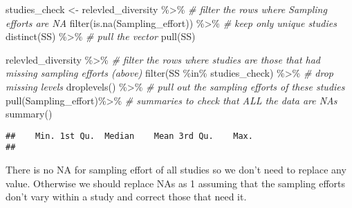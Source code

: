 \documentclass[
]{article}
\newenvironment{Shaded}{\begin{snugshade}}{\end{snugshade}}
\newcommand{\CommentTok}[1]{\textcolor[rgb]{0.56,0.35,0.01}{\textit{#1}}}
\newcommand{\FunctionTok}[1]{\textcolor[rgb]{0.00,0.00,0.00}{#1}}
\newcommand{\NormalTok}[1]{#1}
\newcommand{\OtherTok}[1]{\textcolor[rgb]{0.56,0.35,0.01}{#1}}
\newcommand{\SpecialCharTok}[1]{\textcolor[rgb]{0.00,0.00,0.00}{#1}}
\begin{document}
\begin{Shaded}
\begin{Highlighting}[]
\NormalTok{studies\_check }\OtherTok{\textless{}{-}}\NormalTok{ relevled\_diversity }\SpecialCharTok{\%\textgreater{}\%}
  \CommentTok{\# filter the rows where Sampling efforts are NA}
  \FunctionTok{filter}\NormalTok{(}\FunctionTok{is.na}\NormalTok{(Sampling\_effort)) }\SpecialCharTok{\%\textgreater{}\%}
  \CommentTok{\# keep only unique studies}
  \FunctionTok{distinct}\NormalTok{(SS) }\SpecialCharTok{\%\textgreater{}\%}
  \CommentTok{\# pull the vector}
  \FunctionTok{pull}\NormalTok{(SS)}

\NormalTok{relevled\_diversity }\SpecialCharTok{\%\textgreater{}\%}
  \CommentTok{\# filter the rows where studies are those that had missing sampling efforts (above)}
  \FunctionTok{filter}\NormalTok{(SS }\SpecialCharTok{\%in\%}\NormalTok{ studies\_check) }\SpecialCharTok{\%\textgreater{}\%}
  \CommentTok{\# drop missing levels}
  \FunctionTok{droplevels}\NormalTok{() }\SpecialCharTok{\%\textgreater{}\%}
  \CommentTok{\# pull out the sampling efforts of these studies}
  \FunctionTok{pull}\NormalTok{(Sampling\_effort)}\SpecialCharTok{\%\textgreater{}\%}
  \CommentTok{\# summaries to check that ALL the data are NAs}
  \FunctionTok{summary}\NormalTok{() }
\end{Highlighting}
\end{Shaded}

\begin{verbatim}
##    Min. 1st Qu.  Median    Mean 3rd Qu.    Max. 
## 
\end{verbatim}

There is no NA for sampling effort of all studies so we don't need to
replace any value. Otherwise we should replace NAs as 1 assuming that
the sampling efforts don't vary within a study and correct those that
need it.
\end{document}

